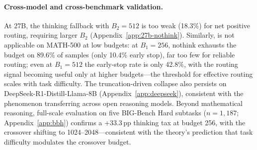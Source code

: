 \paragraph{Cross-model and cross-benchmark validation.}
At 27B, the thinking fallback with $B_2{=}512$ is too weak (18.3\%) for net positive routing, requiring larger $B_2$ (Appendix~\ref{app:27b-nothink}).
Similarly, \method{} is not applicable on MATH-500 at low budgets: at $B_1{=}256$, nothink exhausts the budget on 89.6\% of samples (only 10.4\% early stop), far too few for reliable routing; even at $B_1{=}512$ the early-stop rate is only 42.8\%, with the routing signal becoming useful only at higher budgets---the threshold for effective routing scales with task difficulty.
The truncation-driven collapse also persists on DeepSeek-R1-Distill-Llama-8B (Appendix~\ref{app:deepseek}), consistent with the phenomenon transferring across open reasoning models.
Beyond mathematical reasoning, full-scale evaluation on five BIG-Bench Hard subtasks ($n{=}1{,}187$; Appendix~\ref{app:bbh}) confirms a +33.3\,pp thinking tax at budget 256, with the crossover shifting to 1024--2048---consistent with the theory's prediction that task difficulty modulates the crossover budget.
